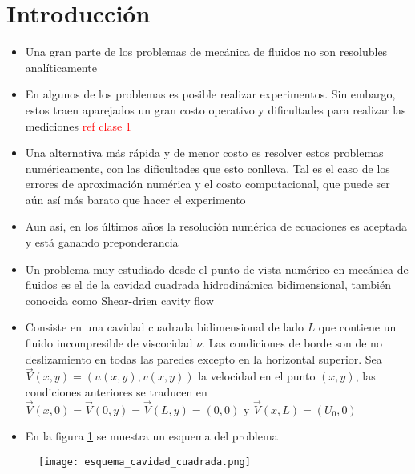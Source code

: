 \documentclass[aps,prb,twocolumn,superscriptaddress,floatfix,longbibliography,10pt]{revtex4-2}
\newif\ifptitle
\newif\ifpnumber
\newcounter{para}
\newcommand\ptitle[1]{\par\refstepcounter{para}
{\ifpnumber{\noindent\textcolor{lightgray}{\textbf{\thepara}}\indent}\fi}
{\ifptitle{\textbf{[{#1}]}}\fi}}
\begin{document}
\section{Introducción}

\ptitle{¿Por qué es importante resolver problemas de fluidos numéricamente? Rtas en la primera clase}

\begin{itemize}
  \item Una gran parte de los problemas de mecánica de fluidos no son resolubles analíticamente
  \item En algunos de los problemas es posible realizar experimentos. Sin embargo, estos traen aparejados un gran costo operativo y dificultades para realizar las mediciones \textcolor{red}{ref clase 1}
  \item Una alternativa más rápida y de menor costo es resolver estos problemas numéricamente, con las dificultades que esto conlleva. Tal es el caso de los errores de aproximación numérica y el costo computacional, que puede ser aún así más barato que hacer el experimento
  \item Aun así, en los últimos años la resolución numérica de ecuaciones es aceptada y está ganando preponderancia
\end{itemize}

\ptitle{Explicar el problema de la cavidad cuadrada hidrodinámica bidimensional}
\begin{itemize}
  \item Un problema muy estudiado desde el punto de vista numérico en mecánica de fluidos es el de la cavidad cuadrada hidrodinámica bidimensional, también conocida como Shear-drien cavity flow
  \item Consiste en una cavidad cuadrada bidimensional de lado $L$ que contiene un fluido incompresible de viscocidad $\nu$. Las condiciones de borde son de no deslizamiento en todas las paredes excepto en la horizontal superior. Sea $\vec{V}(x,y) = (u(x,y), v(x,y))$ la velocidad en el punto $(x,y)$, las condiciones anteriores se traducen en $\vec{V}(x,0) = \vec{V}(0,y) = \vec{V}(L,y) = (0,0)$ y $\vec{V}(x,L) = (U_0,0)$
  \item En la figura \ref{fig:esquema_cavidad_cuadrada} se muestra un esquema del problema
\end{itemize}

\begin{figure}[h]
  \texttt{[image: esquema\_cavidad\_cuadrada.png]}
  \caption{}
   \label{fig:esquema_cavidad_cuadrada}
\end{figure}
\end{document}
